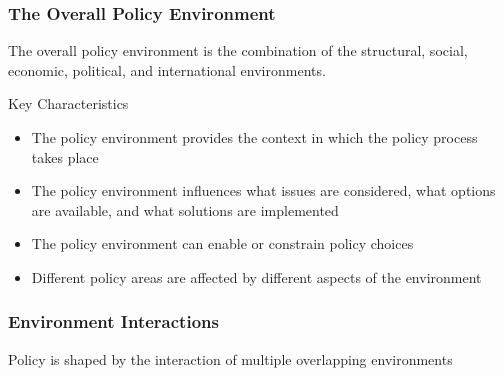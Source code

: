 \documentclass[10pt]{beamer}
\begin{document}
\begin{frame}
\frametitle{The Overall Policy Environment}

\begin{block}{}
The overall policy environment is the combination of the structural, social, economic, political, and international environments.
\end{block}

\pause
\vspace{0.5cm}

\begin{block}{Key Characteristics}
\begin{itemize}
\item The policy environment provides the context in which the policy process takes place
\item The policy environment influences what issues are considered, what options are available, and what solutions are implemented
\item The policy environment can enable or constrain policy choices
\item Different policy areas are affected by different aspects of the environment
\end{itemize}
\end{block}

\end{frame}

\begin{frame}
\frametitle{Environment Interactions}

\begin{center}
\end{center}

\vspace{0.5cm}
\centering
Policy is shaped by the interaction of multiple overlapping environments

\end{frame}
\end{document}
